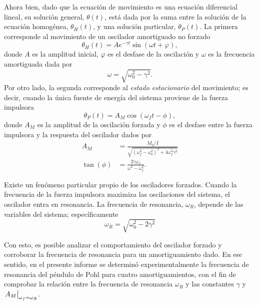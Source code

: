 Ahora bien, dado que la ecuación de movimiento es una ecuación diferencial lineal, su solución
general, $\theta(t)$, está dada por la suma entre la solución de la ecuación homogénea, 
$\theta_H(t)$, y una solución particular, $\theta_P(t)$. La primera corresponde al movimiento
de un oscilador amortiguado no forzado
\begin{equation}\label{eq:solucionhomogeneo}
	\theta_H(t) = Ae^{-\gamma t}\sin(\omega t +\varphi),
\end{equation}
donde $A$ es la amplitud inicial, $\varphi$ es el desfase de la oscilación y $\omega$ es la
frecuencia amortiguada dada por
\begin{equation}\label{eq:omegasolito}
	\omega=\sqrt{\omega_0^2-\gamma^2}.
\end{equation}
Por otro lado, la segunda corresponde al \textit{estado estacionario} del movimiento; es decir,
cuando la única fuente de energía del sistema proviene de la fuerza impulsora
\begin{equation}\label{eq:solucionparticular}
	\theta_P(t) = A_M\cos(\omega_f t - \phi),
\end{equation}
donde $A_M$ es la amplitud de la oscilación forzada y $\phi$ es el desfase entre la fuerza
impulsora y la respuesta del oscilador dados por
\begin{align}
	A_M &= \frac{M_0/I}{\sqrt{\left(\omega_f^2 - \omega_0^2\right)^2 + 4\omega_f^2 \gamma^2}} \label{eq:amplitudforzada} \\
	\tan(\phi) &= \frac{2\gamma\omega_f}{\omega^2 - \omega_f^2}. \label{eq:desfaseforzado}
\end{align}

Existe un fenómeno particular propio de los osciladores forzados. Cuando la frecuencia de la
fuerza impulsora maximiza las oscilaciones del sistema, el oscilador entra en resonancia.
La frecuencia de resonancia, $\omega_R$, depende de las variables del sistema; específicamente
\begin{equation}\label{eq:frecuenciaresonancia}
	\omega_R = \sqrt{\omega_0^2 - 2\gamma^2}
\end{equation}

Con esto, es posible analizar el comportamiento del oscilador forzado y corroborar la
frecuencia de resonancia para un amortiguamiento dado. En ese sentido, en el presente informe
se determinó experimentalmente la frecuencia de resonancia del péndulo de Pohl para cuatro
amortiguamientos, con el fin de comprobar la relación entre la frecuencia de resonancia
$\omega_R$ y las constantes $\gamma$ y $\eval{A_M}_{\omega_f=\omega_R}$.

